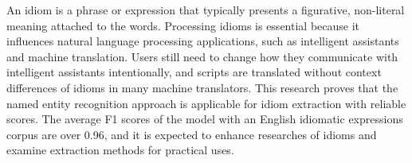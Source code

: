 An idiom is a phrase or expression that typically presents a figurative, non-literal meaning attached to the words. Processing idioms is essential because it influences natural language processing applications, such as intelligent assistants and machine translation. Users still need to change how they communicate with intelligent assistants intentionally, and scripts are translated without context differences of idioms in many machine translators. This research proves that the named entity recognition approach is applicable for idiom extraction with reliable scores. The average F1 scores of the model with an English idiomatic expressions corpus are over 0.96, and it is expected to enhance researches of idioms and examine extraction methods for practical uses.
